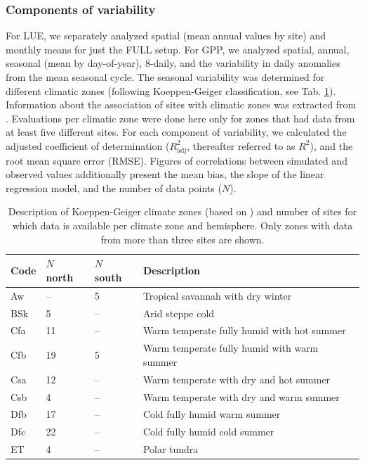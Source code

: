 \documentclass{myreport}
\begin{document}
\subsubsection{Components of variability}
\label{sec:evalmethod_variability}
For LUE, we separately analyzed spatial (mean annual values by site) and monthly means for just the FULL setup. For GPP, we analyzed spatial, annual, seasonal (mean by day-of-year), 8-daily, and the variability in daily anomalies from the mean seasonal cycle. The seasonal variability was determined for different climatic zones (following Koeppen-Geiger classification, see Tab. \ref{tab:kgclimate}). Information about the association of sites with climatic zones was extracted from \cite{falge17}. Evaluations per climatic zone were done here only for zones that had data from at least five different sites. For each component of variability, we calculated the adjusted coefficient of determination ($R^2_\text{adj}$, thereafter referred to as $R^2$), and the root mean square error (RMSE). Figures of correlations between simulated and observed values additionally present the mean bias, the slope of the linear regression model, and the number of data points ($N$).

\begin{table}
\caption{Description of Koeppen-Geiger climate zones (based on \cite{falge17}) and number of sites for which data is available per climate zone and hemisphere. Only zones with data from more than three sites are shown.} 
\centering
\begin{tabular}{llll}
  \toprule
  Code & $N$ north & $N$ south & Description \\ 
  \midrule
   Aw   & -- & 5 &  Tropical savannah with dry winter \\ 
   BSk  & 5 & -- & Arid steppe cold \\ 
   Cfa  & 11 & -- & Warm temperate fully humid with hot summer \\ 
   Cfb  & 19 & 5 & Warm temperate fully humid with warm summer \\ 
   Csa  & 12 & -- & Warm temperate with dry and hot summer \\ 
   Csb  & 4 & -- & Warm temperate with dry and warm summer \\ 
   Dfb  & 17 & -- & Cold fully humid warm summer \\ 
   Dfc  & 22 & -- & Cold fully humid cold summer \\ 
   ET   & 4 & -- & Polar tundra \\ 
   \bottomrule
  \end{tabular}
  \label{tab:kgclimate}
\end{table}
\end{document}
